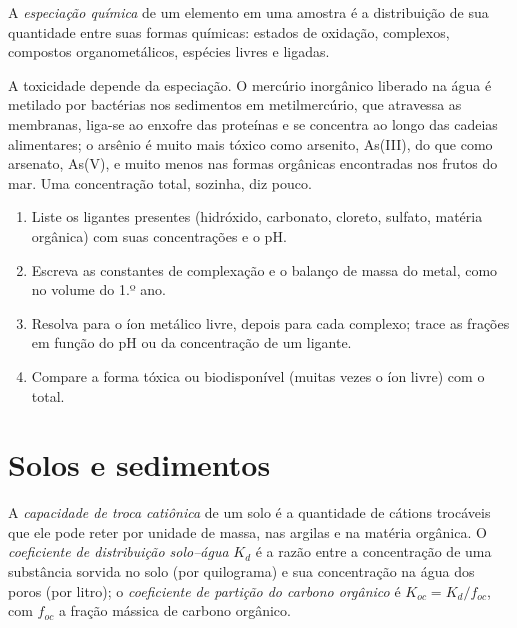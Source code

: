 \begin{definition}[Especiação]\label{def:b3:environmental-toxicology:speciation}
A \emph{especiação química} de um elemento em uma
amostra é a distribuição de sua quantidade entre suas formas químicas: estados de
oxidação, complexos, compostos organometálicos, espécies livres e ligadas.
\end{definition}

A toxicidade depende da especiação. O mercúrio inorgânico liberado na água é
metilado por bactérias nos sedimentos em metilmercúrio, que atravessa as membranas,
liga-se ao enxofre das proteínas e se concentra ao longo das cadeias alimentares; o arsênio é muito mais
tóxico como arsenito, As(III), do que como arsenato, As(V), e muito menos nas formas
orgânicas encontradas nos frutos do mar. Uma concentração total, sozinha, diz pouco.

\begin{method}\label{met:b3:environmental-toxicology:speciation}
\begin{enumerate}
  \item Liste os ligantes presentes (hidróxido, carbonato, cloreto, sulfato, matéria
        orgânica) com suas concentrações e o pH.
  \item Escreva as constantes de complexação e o balanço de massa do metal, como no
        volume do 1.º ano.
  \item Resolva para o íon metálico livre, depois para cada complexo; trace as frações em função do
        pH ou da concentração de um ligante.
  \item Compare a forma tóxica ou biodisponível (muitas vezes o íon livre) com o total.
\end{enumerate}
\end{method}

\section{Solos e sedimentos}

\begin{definition}\label{def:b3:environmental-toxicology:soil}
A \emph{capacidade de troca catiônica} de um solo é
a quantidade de cátions trocáveis que ele pode reter por unidade de massa, nas argilas e na matéria
orgânica. O \emph{coeficiente de distribuição solo--água}
$K_d$ é a razão entre a concentração de uma substância
sorvida no solo (por quilograma) e sua concentração na água dos poros (por
litro); o \emph{coeficiente de partição do carbono orgânico}
é $K_{oc} = K_d/f_{oc}$, com $f_{oc}$ a fração mássica de carbono orgânico.
\end{definition}

